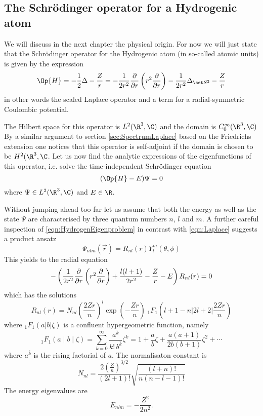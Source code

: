 \subsection{The Schrödinger operator for a Hydrogenic atom}
We will discuss in the next chapter the physical origin.
For now we will just state that the Schrödinger operator for the Hydrogenic atom
(in so-called atomic units)
is given by the expression
\begin{equation}
	\Op{H} = - \frac12 \Delta - \frac{Z}{r} = -\frac{1}{2r^2} \laplaceRadial -\frac{1}{2r^2} \laplaceSphere - \frac{Z}{r}
	\label{eqn:HydrogenOperator}
\end{equation}
in other words the scaled Laplace operator and a term for a radial-symmetric Coulombic
potential.

The Hilbert space for this operator is $L^2(\R^3, \C)$
and the domain is $C^\infty_0(\R^3, \C)$
By a similar argument to section \vref{sec:SpectrumLaplace} based on the
Friedrichs extension one notices that this operator is self-adjoint
if the domain is chosen to be $H^2(\R^3, \C$.
Let us now find the analytic expressions of the eigenfunctions of this operator,
i.e. solve the time-independent Schrödinger equation
\begin{equation}
	( \Op{H} - E ) \Psi = 0
	\label{eqn:HydrogenEigenproblem}
\end{equation}
where $\Psi \in L^2(\R^3, \C)$ and $E \in \R$.

Without jumping ahead too far let us assume that both the energy as well
as the state $\Psi$ are characterised by three quantum numbers $n$, $l$ and $m$.
A further careful inspection of \eqref{eqn:HydrogenEigenproblem}
in contrast with \eqref{eqn:Laplace} suggests a product ansatz
\[ \Psi_{nlm}(\vec{r}) = R_{nl}(r) Y_l^m(\theta, \phi) \]
This yields to the radial equation
\begin{equation}
	- \left( \frac{1}{2r^2} \frac{\partial}{\partial r} \left( r^2 \frac{\partial}{\partial r} \right) + \frac{l (l+1)}{2 r^2} - \frac{Z}{r} - E \right) R_{nl}(r) = 0
	\label{eqn:HydrogenRadial}
\end{equation}
which has the solutions~\cite{Mueller2000}
\begin{equation}
	 R_{nl}(r) = N_{nl} \left(\frac{2Zr}{n}\right)^l \exp\left(-\frac{Zr}{n} \right)
\;_1F_1\left(l+1-n | 2l+2|\frac{2Zr}{n}\right)
	\label{eqn:HydrogenRadialSolution}
\end{equation}
where $_1F_1\left(a|b|\zeta\right)$ is a confluent hypergeometric function,
namely~\cite{Avery2006}
\[ _1F_1\left(a \middle| b \middle| \zeta\right) =
\sum_{k=0}^\infty \frac{a^{\bar{k}}}{k! \, b^{\bar{k}}} \zeta^k =
1 + \frac{a}{b} \zeta + \frac{a(a+1)}{2b(b+1)} \zeta^2 + \cdots \]
where $a^{\bar{k}}$ is the rising factorial of $a$.
The normalisaton constant is
\[ N_{nl} = \frac{2 \left( \frac{Z}{n} \right)^{3/2}}{(2l+1)!} \sqrt{ \frac{(l+n)!}{n (n-l-1)!}} \]
The energy eigenvalues are
\[ E_{nlm} = - \frac{Z^2}{2n^2}. \]

